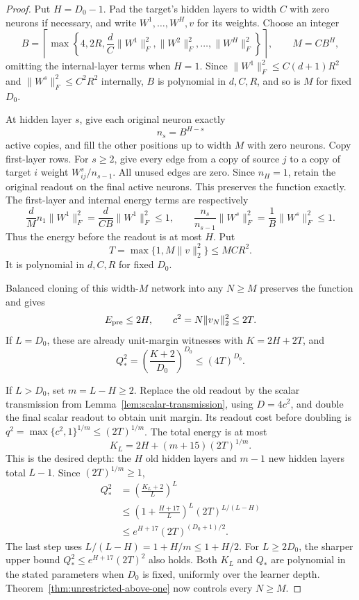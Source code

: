 \begin{proof}
Put $H=D_0-1$. Pad the target's hidden layers to width $C$ with zero
neurons if necessary, and write $W^1,\ldots,W^H,v$ for its weights.
Choose an integer
\[
 B=\left\lceil\max\left\{4,2R,\frac dC\|W^1\|_F^2,
                 \|W^2\|_F^2,\ldots,\|W^H\|_F^2\right\}\right\rceil,
 \qquad M=CB^H,
\]
omitting the internal-layer terms when $H=1$.
Since $\|W^1\|_F^2\le C(d+1)R^2$ and
$\|W^s\|_F^2\le C^2R^2$ internally, $B$ is polynomial in $d,C,R$,
and so is $M$ for fixed $D_0$.

At hidden layer $s$, give each original neuron exactly
\[
 n_s=B^{H-s}
\]
active copies, and fill the other positions up to width $M$ with zero
neurons. Copy first-layer rows. For $s\ge2$, give every edge from a copy
of source $j$ to a copy of target $i$ weight $W^s_{ij}/n_{s-1}$.
All unused edges are zero. Since $n_H=1$, retain the original readout
on the final active neurons. This preserves the function exactly.
The first-layer and internal energy terms are respectively
\[
 \frac dM n_1\|W^1\|_F^2
      =\frac d{CB}\|W^1\|_F^2\le1,
 \qquad
 \frac{n_s}{n_{s-1}}\|W^s\|_F^2
      =\frac1B\|W^s\|_F^2\le1.
\]
Thus the energy before the readout is at most $H$. Put
\[
 T=\max\{1,M\|v\|_2^2\}\le MC R^2.
\]
It is polynomial in $d,C,R$ for fixed $D_0$.

Balanced cloning of this width-$M$ network into any $N\ge M$ preserves
the function and gives
\[
 E_{\rm pre}\le2H,\qquad c^2=N\|v_N\|_2^2\le2T.
\]
If $L=D_0$, these are already unit-margin witnesses with
$K=2H+2T$, and
\[
 Q_*^2=\left(\frac{K+2}{D_0}\right)^{D_0}
       \le(4T)^{D_0}.
\]

If $L>D_0$, set $m=L-H\ge2$. Replace the old readout by the scalar
transmission from Lemma~\ref{lem:scalar-transmission}, using $D=4c^2$,
and double the final scalar readout to obtain unit margin. Its readout
cost before doubling is
$q^2=\max\{c^2,1\}^{1/m}\le(2T)^{1/m}$.
The total energy is at most
\[
 K_L=2H+(m+15)(2T)^{1/m}.
\]
This is the desired depth: the $H$ old hidden layers and $m-1$ new hidden
layers total $L-1$. Since $(2T)^{1/m}\ge1$,
\begin{align*}
 Q_*^2
 &=\left(\frac{K_L+2}{L}\right)^L\\
 &\le\left(1+\frac{H+17}{L}\right)^L(2T)^{L/(L-H)}\\
 &\le e^{H+17}(2T)^{(D_0+1)/2}.
\end{align*}
The last step uses $L/(L-H)=1+H/m\le1+H/2$.
For $L\ge2D_0$, the sharper upper bound
$Q_*^2\le e^{H+17}(2T)^2$ also holds.
Both $K_L$ and $Q_*$ are polynomial in the stated parameters when
$D_0$ is fixed, uniformly over the learner depth.
Theorem~\ref{thm:unrestricted-above-one} now controls every $N\ge M$.


\end{proof}
